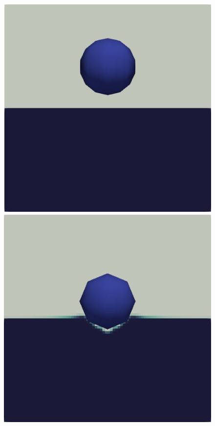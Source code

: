 \begin{figure}[H]
    \centering
    \begin{minipage}{.4\textwidth}
        \centering
        \includegraphics[width=\linewidth]{GWU_Thesis_Sarmakeeva/Images/chap4/water_sphere/sphere_in_water0.png}
    \end{minipage}%
    \hspace{0.05\textwidth}
    \begin{minipage}{.4\textwidth}
        \centering
        \includegraphics[width=\linewidth]{GWU_Thesis_Sarmakeeva/Images/chap4/water_sphere/sphere_in_water02.png}

\end{minipage}
\end{figure}
